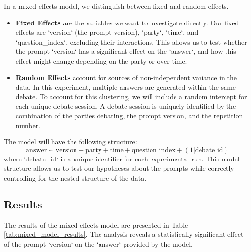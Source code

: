 \documentclass[12pt]{article}
\begin{document}
In a mixed-effects model, we distinguish between fixed and random effects.
\begin{itemize}
    \item \textbf{Fixed Effects} are the variables we want to investigate directly. Our fixed effects are `version` (the prompt version), `party`, `time`, and `question\_index`, excluding their interactions. This allows us to test whether the prompt `version` has a significant effect on the `answer`, and how this effect might change depending on the party or over time.
    \item \textbf{Random Effects} account for sources of non-independent variance in the data. In this experiment, multiple answers are generated within the same debate. To account for this clustering, we will include a random intercept for each unique debate session. A debate session is uniquely identified by the combination of the parties debating, the prompt version, and the repetition number.
\end{itemize}

The model will have the following structure:
\begin{equation}
    \text{answer} \sim \text{version} + \text{party} + \text{time} + \text{question\_index} + (1 | \text{debate\_id})
\end{equation}
where `debate\_id` is a unique identifier for each experimental run. This model structure allows us to test our hypotheses about the prompts while correctly controlling for the nested structure of the data.

\subsection{Results}
The results of the mixed-effects model are presented in Table \ref{tab:mixed_model_results}. The analysis reveals a statistically significant effect of the prompt `version` on the `answer` provided by the model.
\end{document}
